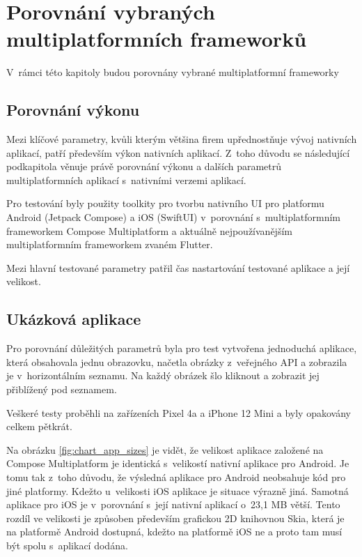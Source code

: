 \section{Porovnání vybraných multiplatformních frameworků}

V~rámci této kapitoly budou porovnány vybrané multiplatformní frameworky


\subsection{Porovnání výkonu} \label{performanceSection}

Mezi klíčové parametry, kvůli kterým většina firem upřednostňuje vývoj nativních aplikací, patří především výkon
nativních aplikací. Z~toho důvodu se následující podkapitola věnuje právě porovnání výkonu a dalších parametrů multiplatformních aplikací
s~nativními verzemi aplikací. 

Pro testování byly použity toolkity pro tvorbu nativního UI pro platformu Android (Jetpack Compose) a iOS (SwiftUI)
v~porovnání s~multiplatformním frameworkem Compose Multiplatform a aktuálně nejpoužívanějším multiplatformním
frameworkem zvaném Flutter. \cite{crossPlatformFrameworksStats} 

Mezi hlavní testované parametry patřil čas nastartování testované aplikace a její velikost.

\subsection*{Ukázková aplikace}
Pro porovnání důležitých parametrů byla pro test vytvořena jednoduchá aplikace, která obsahovala jednu obrazovku, 
načetla obrázky z~veřejného API a zobrazila je v~horizontálním seznamu. 
Na každý obrázek šlo kliknout a zobrazit jej přiblížený pod seznamem. 

Veškeré testy proběhli na zařízeních Pixel 4a a iPhone 12 Mini a byly opakovány celkem pětkrát.





Na obrázku \ref{fig:chart_app_sizes} je vidět, že velikost aplikace založené na Compose Multiplatform je identická
s~velikostí nativní aplikace pro Android. Je tomu tak z~toho důvodu, že výsledná aplikace pro Android neobsahuje kód 
pro jiné platformy. \cite{} Kdežto u~velikosti iOS aplikace je situace výrazně jiná. Samotná aplikace pro iOS je v~porovnání
s~její nativní aplikací o~23,1 MB větší. Tento rozdíl ve velikosti je způsoben především grafickou 2D knihovnou Skia,
která je na platformě Android dostupná, kdežto na platformě iOS ne a proto tam musí být spolu s~aplikací dodána. \cite{}

